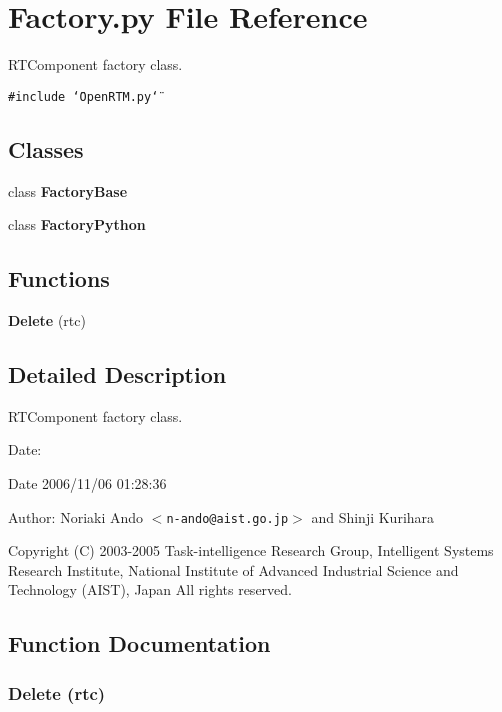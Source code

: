 \section{Factory.py File Reference}
\label{Factory_8py}
RTComponent factory class. 

{\tt \#include \char`\"{}Open\-RTM.py\char`\"{}}\par
\subsection*{Classes}
\begin{CompactItemize}
\item 
class {\bf Factory\-Base}
\item 
class {\bf Factory\-Python}
\end{CompactItemize}
\subsection*{Functions}
\begin{CompactItemize}
\item 
{\bf Delete} (rtc)
\end{CompactItemize}


\subsection{Detailed Description}
RTComponent factory class. 

\begin{Desc}
\item[Date:]\begin{Desc}
\item[Date]2006/11/06 01:28:36 \end{Desc}
\end{Desc}
\begin{Desc}
\item[Author:]Noriaki Ando $<${\tt n-ando@aist.go.jp}$>$ and Shinji Kurihara\end{Desc}
Copyright (C) 2003-2005 Task-intelligence Research Group, Intelligent Systems Research Institute, National Institute of Advanced Industrial Science and Technology (AIST), Japan All rights reserved.

\subsection{Function Documentation}
\subsubsection{\setlength{\rightskip}{0pt plus 5cm}Delete (rtc)}\label{Factory_8py_a0}


